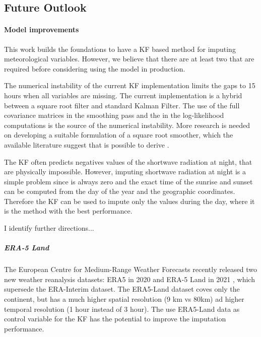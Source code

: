 \documentclass{article}
\let\Oldsubsection\subsection
\renewcommand{\subsection}{\FloatBarrier\Oldsubsection}
\begin{document}



\subsection{Future Outlook}

\paragraph{Model improvements} This work builds the foundations to have a KF based method for imputing meteorological variables. However, we believe that there are at least two that are required before considering using the model in production.

The numerical instability of the current KF implementation limits the gaps to 15 hours when all variables are missing. The current implementation is a hybrid between a square root filter and standard Kalman Filter. The use of the full covariance matrices in the smoothing pass and the in the log-likelihood computations is the source of the numerical instability. More research is needed on developing a suitable formulation of a square root smoother, which the available literature suggest that is possible to derive \cite{rutten_square-root_2013, park_new_1996}. 

The KF often predicts negatives values of the shortwave radiation at night, that are physically impossible. However, imputing shortwave radiation at night is a simple problem since is always zero and the exact time of the sunrise and sunset can be computed from the day of the year and the geographic coordinates. Therefore the KF can be used to impute only the values during the day, where it is the method with the best performance.

I identify further directions...

\subparagraph{ERA-5 Land} The European Centre for Medium-Range Weather Forecasts recently released two new weather reanalysis datasets: ERA5 in 2020 \cite{hersbach_era5_2020} and ERA-5 Land  in 2021 \cite{munoz-sabater_era5-land_2021}, which supersede the ERA-Interim dataset. The ERA5-Land dataset coves only the continent, but has a much higher spatial resolution (9 km vs 80km) ad higher temporal resolution (1 hour instead of 3 hour). The use ERA5-Land data as control variable for the KF has the potential to improve the imputation performance.
\end{document}
